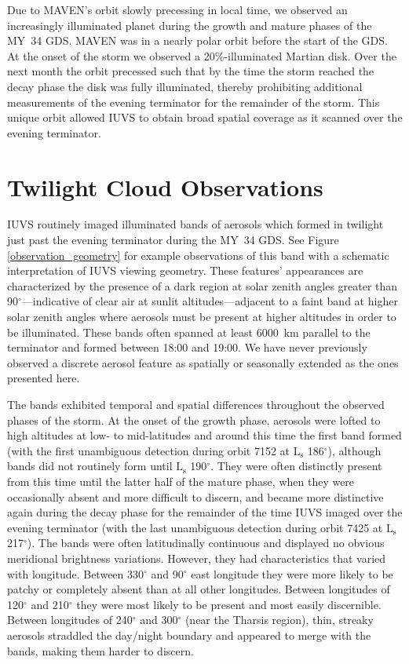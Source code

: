 \documentclass[draft]{agujournal2019}
\begin{document}
Due to MAVEN's orbit slowly precessing in local time, we observed an increasingly illuminated planet during the growth and mature phases of the MY~34 GDS. MAVEN was in a nearly polar orbit before the start of the GDS. At the onset of the storm we observed a 20\%-illuminated Martian disk. Over the next month the orbit precessed such that by the time the storm reached the decay phase the disk was fully illuminated, thereby prohibiting additional measurements of the evening terminator for the remainder of the storm. This unique orbit allowed IUVS to obtain broad spatial coverage as it scanned over the evening terminator.

\section{Twilight Cloud Observations}
IUVS routinely imaged illuminated bands of aerosols which formed in twilight just past the evening terminator during the MY~34 GDS. See Figure \ref{observation_geometry} for example observations of this band with a schematic interpretation of IUVS viewing geometry. These features' appearances are characterized by the presence of a dark region at solar zenith angles greater than 90$^\circ$---indicative of clear air at sunlit altitudes---adjacent to a faint band at higher solar zenith angles where aerosols must be present at higher altitudes in order to be illuminated. These bands often spanned at least 6000~km parallel to the terminator and formed between 18:00 and 19:00. We have never previously observed a discrete aerosol feature as spatially or seasonally extended as the ones presented here.

The bands exhibited temporal and spatial differences throughout the observed phases of the storm. At the onset of the growth phase, aerosols were lofted to high altitudes at low- to mid-latitudes and around this time the first band formed (with the first unambiguous detection during orbit 7152 at $\mathrm{L_s}$ 186$^\circ$), although bands did not routinely form until $\mathrm{L_s}$ 190$^\circ$. They were often distinctly present from this time until the latter half of the mature phase, when they were occasionally absent and more difficult to discern, and became more distinctive again during the decay phase for the remainder of the time IUVS imaged over the evening terminator (with the last unambiguous detection during orbit 7425 at $\mathrm{L_s}$ 217$^\circ$). The bands were often latitudinally continuous and displayed no obvious meridional brightness variations. However, they had characteristics that varied with longitude. Between 330$^\circ$ and 90$^\circ$ east longitude they were more likely to be patchy or completely absent than at all other longitudes. Between longitudes of 120$^\circ$ and 210$^\circ$ they were most likely to be present and most easily discernible. Between longitudes of 240$^\circ$ and 300$^\circ$ (near the Tharsis region), thin, streaky aerosols straddled the day/night boundary and appeared to merge with the bands, making them harder to discern.
\end{document}
